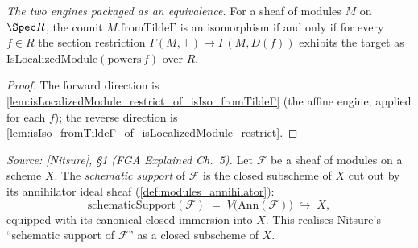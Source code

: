 \begin{lemma}
  \label{lem:isIso_fromTildeΓ_iff_isLocalizedModule_restrict}
  \textit{The two engines packaged as an equivalence.}
  For a sheaf of modules \(M\) on \(\Spec R\), the counit \(M.\mathrm{fromTildeΓ}\) is an
  isomorphism if and only if for every \(f \in R\) the section restriction
  \(\Gamma(M, \top) \to \Gamma(M, D(f))\) exhibits the target as
  \(\mathrm{IsLocalizedModule}(\mathrm{powers}\,f)\) over \(R\).
\end{lemma}
\begin{proof}
  The forward direction is \cref{lem:isLocalizedModule_restrict_of_isIso_fromTildeΓ} (the affine
  engine, applied for each \(f\)); the reverse direction is
  \cref{lem:isIso_fromTildeΓ_of_isLocalizedModule_restrict}.
\end{proof}

\begin{definition}

  \label{def:schematic_support}
  \textit{Source: [Nitsure], \S 1 (FGA Explained Ch.~5).}
  Let \(\mathcal{F}\) be a sheaf of modules on a scheme \(X\). The
  \emph{schematic support} of \(\mathcal{F}\) is the closed subscheme of \(X\)
  cut out by its annihilator ideal sheaf (\cref{def:modules_annihilator}):
  \[
    \mathrm{schematicSupport}(\mathcal{F})
    \;=\; V\bigl(\mathrm{Ann}(\mathcal{F})\bigr) \;\hookrightarrow\; X,
  \]
  equipped with its canonical closed immersion into \(X\). This realises
  Nitsure's ``schematic support of \(\mathcal{F}\)'' as a closed subscheme of
  \(X\).
\end{definition}

